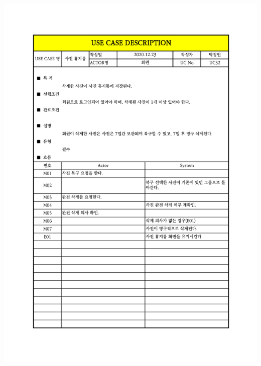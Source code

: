 {{{{{{{{{{{{{{{{{{{{{{{{{{{{{{{{{{\includegraphics[width=1.1\textwidth]{./Figure/Design/Display/usecase/032.pdf} \\
}}}}}}}}}}}}}}}}}}}}}}}}}}}}}}}}}}
